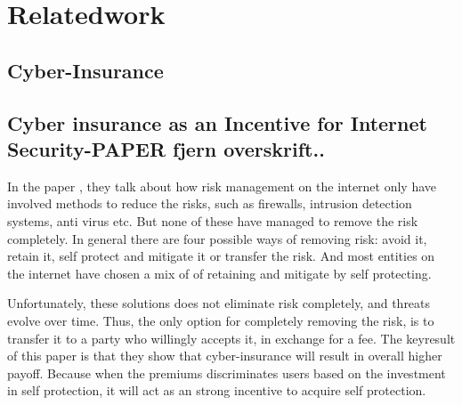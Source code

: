 \chapter{Relatedwork}
\label{chp:relatedwork} 



\section{Cyber-Insurance}


\section{Cyber insurance as an Incentive for Internet Security-PAPER fjern overskrift..}
In the paper \cite{bolot2008cyber}, they talk about how risk management on the internet only have involved methods to reduce the risks, such as firewalls, intrusion detection systems, anti virus etc. But none of these have managed to remove the risk completely. In general there are four possible ways of removing risk: avoid it, retain it, self protect and mitigate it or transfer the risk. And most entities on the internet have chosen a mix of of retaining and mitigate by self protecting. 

Unfortunately, these solutions does not eliminate risk completely, and threats evolve over time. Thus, the only option for completely removing the risk, is to transfer it to a party who willingly accepts it, in exchange for a fee. The keyresult of this paper is that they show that cyber-insurance will result in overall higher payoff. Because when the premiums discriminates users based on the investment in self protection, it will act as an strong incentive to acquire self protection. 

